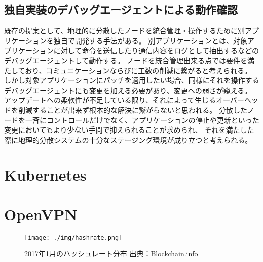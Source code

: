 \subsection{独自実装のデバッグエージェントによる動作確認}
既存の提案として、地理的に分散したノードを統合管理・操作するために別アプリケーションを独自で開発する手法がある。
別アプリケーションとは、対象アプリケーションに対して命令を送信したり通信内容をログとして抽出するなどのデバッグエージェントして動作する。
ノードを統合管理出来る点では要件を満たしており、コミュニケーションならびに工数の削減に繋がると考えられる。
しかし対象アプリケーションにパッチを適用したい場合、同様にそれを操作するデバッグエージェントにも変更を加える必要があり、変更への弱さが窺える。
アップデートへの柔軟性が不足している限り、それによって生じるオーバーヘッドを削減することが出来ず根本的な解決に繋がらないと思われる。
分散したノードを一斉にコントロールだけでなく、アプリケーションの停止や更新といった変更においてもより少ない手間で抑えられることが求められ、
それを満たした際に地理的分散システムの十分なステージング環境が成り立つと考えられる。

\section{Kubernetes}

\section{OpenVPN}

\begin{figure}[h]
    \begin{center}
        \texttt{[image: ./img/hashrate.png]}
        \caption{2017年1月のハッシュレート分布 出典：Blockchain.info\cite{bitcoinhashrate}}
        \label{img:hashrate}
    \end{center}
\end{figure}
\fi
